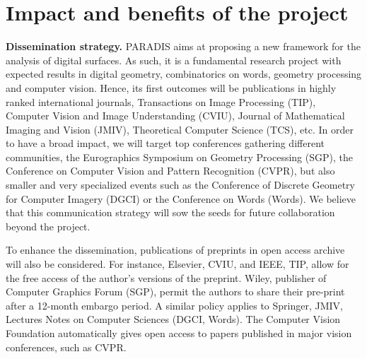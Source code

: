 \section{Impact and benefits of the project}
\label{sec:impact}



\noindent\textbf{Dissemination strategy.}
PARADIS aims at proposing a new framework for the analysis of digital surfaces.
As such, it is a fundamental research project with expected results in digital
geometry, combinatorics on words, geometry processing and computer vision. Hence,
its first outcomes will be publications in highly ranked international journals,
\eg Transactions on Image Processing (TIP), Computer Vision and Image Understanding (CVIU),
Journal of Mathematical Imaging and Vision (JMIV), Theoretical Computer Science (TCS), etc.
In order to have a broad impact, we will target top conferences gathering different communities,
\eg the Eurographics Symposium on Geometry Processing (SGP),
the Conference on Computer Vision and Pattern Recognition (CVPR),
but also smaller and very specialized events such as the Conference
of Discrete Geometry for Computer Imagery (DGCI) or the Conference on Words (Words). 
We believe that this communication strategy will sow the seeds for future collaboration
beyond the project.

To enhance the dissemination, publications of preprints in open access archive
will also be considered. For instance, Elsevier, \eg CVIU, and IEEE, \eg TIP,
allow for the free access of the author's versions of the preprint.
Wiley, publisher of Computer Graphics Forum (SGP), permit the authors to share their pre-print after
a 12-month embargo period. A similar policy applies to Springer, \eg JMIV,
Lectures Notes on Computer Sciences (DGCI, Words). The Computer Vision Foundation
automatically gives open access to papers published in major vision conferences, such as CVPR. 

